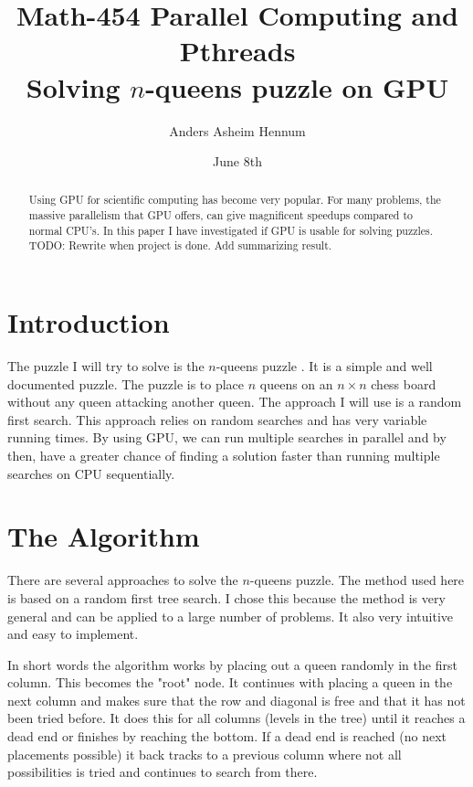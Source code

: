 \documentclass{article}
\title{Math-454 Parallel Computing and Pthreads \\
		Solving $n$-queens puzzle on GPU}
\author{Anders Asheim Hennum}
\date{June 8th}
\begin{document}
\maketitle

\begin{abstract}
Using GPU for scientific computing has become very popular. For many problems, 
the massive parallelism that GPU offers, can give magnificent speedups compared to 
normal CPU's. In this paper I have investigated if GPU is usable for solving puzzles. 
TODO: Rewrite when project is done. Add summarizing result.
\end{abstract}

\section{Introduction}

The puzzle I will try to solve is the $n$-queens puzzle \cite{nqueen}. It is a simple
and well documented puzzle. The puzzle is to place $n$ queens on an $n \times n$ chess
board without any queen attacking another queen. The approach I will use is a random first search. 
This approach relies on random searches and has very variable running times.
By using GPU, we can run multiple searches in parallel and by then, have a greater chance of finding
a solution faster than running multiple searches on CPU sequentially. 

\section{The Algorithm}

There are several approaches to solve the $n$-queens puzzle. The method used here
is based on a random first tree search. I chose this because the method is very general
and can be applied to a large number of problems. It also very intuitive and easy to implement. 

In short words the algorithm works by placing out a queen 
randomly in the first column. This becomes the "root" node. It continues with placing
a queen in the next column and makes sure that the row and diagonal is free and that it has
not been tried before. It does this for all columns (levels in the tree) until it reaches a dead end or
finishes by reaching the bottom. If a dead end is reached (no next placements possible) it back tracks to
a previous column where not all possibilities is tried and continues to search from there. 
\end{document}
